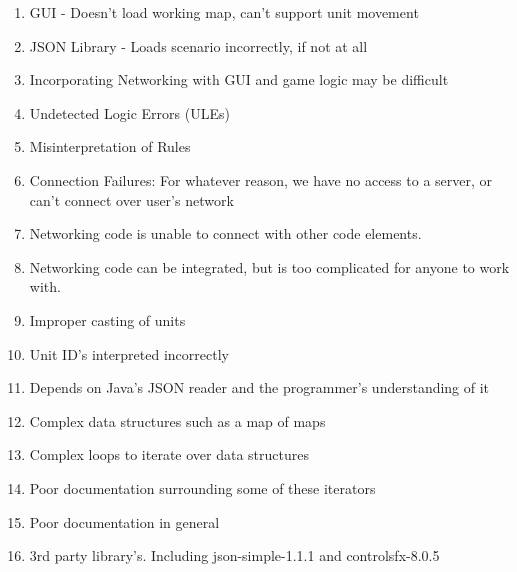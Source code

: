 {{\begin{enumerate}
\item  GUI - Doesn't load working map, can't support unit movement
\item  JSON Library - Loads scenario incorrectly, if not at all
\item  Incorporating Networking with GUI and game logic may be difficult
\item  Undetected Logic Errors (ULEs)
\item  Misinterpretation of Rules
\item  Connection Failures: For whatever reason, we have no access to a server, or can't connect over user's network
\item  Networking code is unable to connect with other code elements.
\item  Networking code can be integrated, but is too complicated for anyone to work with.
\item Improper casting of units
\item Unit ID's interpreted incorrectly
\item Depends on Java's JSON reader and the programmer's understanding of it
\item Complex data structures such as a map of maps
\item Complex loops to iterate over data structures
\item Poor documentation surrounding some of these iterators
\item Poor documentation in general
\item 3rd party library's. Including json-simple-1.1.1 and controlsfx-8.0.5
\end{enumerate}
}
}

